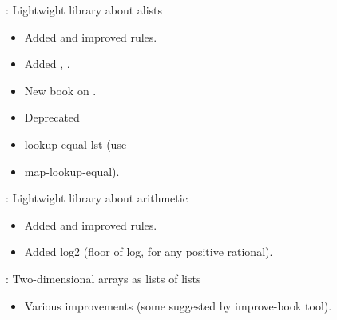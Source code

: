
\begin{frame}

\implibtitle

:
Lightwight library about alists
\begin{itemize}
\item Added and improved rules.
\item Added , .
\item New book on .
\item Deprecated \item{lookup-equal-lst} (use \item{map-lookup-equal}).
\end{itemize}

\end{frame}


\begin{frame}

\implibtitle

:
Lightwight library about arithmetic
\begin{itemize}
\item Added and improved rules.
\item Added log2 (floor of log, for any positive rational).
\end{itemize}

\end{frame}


\begin{frame}

\implibtitle

:
Two-dimensional arrays as lists of lists
\begin{itemize}
\item Various improvements (some suggested by improve-book tool).
\end{itemize}

\end{frame}


